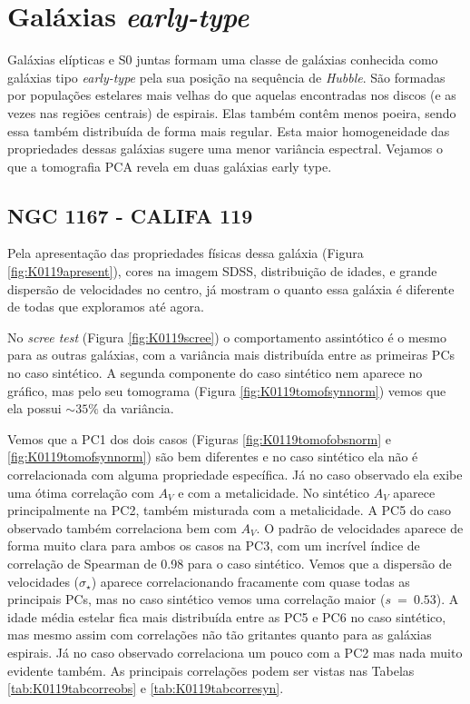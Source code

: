 \section{Gal\'axias {\em early-type}}
\label{sec:result:elipt}

Galáxias elípticas e S0 juntas formam uma classe de galáxias conhecida como galáxias tipo {\em early-type} pela sua
posição na sequência de {\em Hubble}. São formadas por populações estelares mais velhas do que aquelas encontradas nos
discos (e as vezes nas regiões centrais) de espirais. Elas também contêm menos poeira, sendo essa também distribuída de
forma mais regular. Esta maior homogeneidade das propriedades dessas galáxias sugere uma menor variância espectral.
Vejamos o que a tomografia PCA revela em duas galáxias early type.

\subsection{NGC 1167 - CALIFA 119}

Pela apresentação das propriedades físicas dessa galáxia (Figura \ref{fig:K0119apresent}), cores na imagem SDSS,
distribuição de idades, e grande dispersão de velocidades no centro, já mostram o quanto essa galáxia é diferente de
todas que exploramos até agora.

No {\em scree test} (Figura \ref{fig:K0119scree}) o comportamento assintótico é o mesmo para as outras galáxias, com a
variância mais distribuída entre as primeiras PCs no caso sintético. A segunda componente do caso sintético nem aparece
no gráfico, mas pelo seu tomograma (Figura \ref{fig:K0119tomofsynnorm}) vemos que ela possui $\sim 35\%$ da variância.

Vemos que a PC1 dos dois casos (Figuras \ref{fig:K0119tomofobsnorm} e \ref{fig:K0119tomofsynnorm}) são bem diferentes e
no caso sintético ela não é correlacionada com alguma propriedade específica. Já no caso observado ela exibe uma ótima
correlação com $A_V$ e com a metalicidade. No sintético $A_V$ aparece principalmente na PC2, também misturada com a
metalicidade. A PC5 do caso observado também correlaciona bem com $A_V$. O padrão de velocidades aparece de forma muito
clara para ambos os casos na PC3, com um incrível índice de correlação de Spearman de 0.98 para o caso sintético. Vemos
que a dispersão de velocidades ($\sigma_\star$) aparece correlacionando fracamente com quase todas as principais PCs,
mas no caso sintético vemos uma correlação maior ($s\ =\ 0.53$). A idade média estelar fica mais distribuída entre as
PC5 e PC6 no caso sintético, mas mesmo assim com correlações não tão gritantes quanto para as galáxias espirais. Já no
caso observado correlaciona um pouco com a PC2 mas nada muito evidente também. As principais correlações podem ser
vistas nas Tabelas \ref{tab:K0119tabcorreobs} e \ref{tab:K0119tabcorresyn}.

